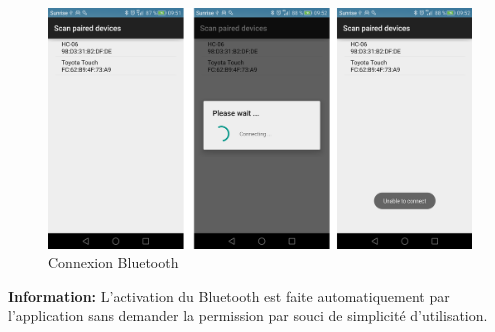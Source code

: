 \begin{figure}[H]
	\begin{center}
		\includegraphics[width=14cm]{img/bluetooth.png}
		\caption{Connexion Bluetooth}
		\label{bluetooth}
	\end{center}
\end{figure}
\textbf{Information: } L'activation du Bluetooth est faite automatiquement par l'application sans demander la permission par souci de simplicité d'utilisation.\\
